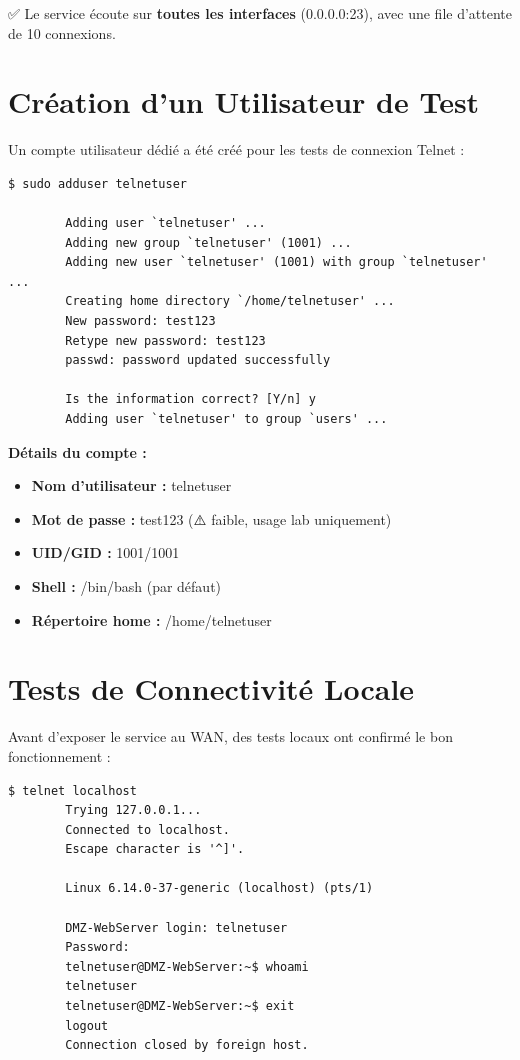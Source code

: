 \documentclass[12pt,a4paper,openany]{report}
\begin{document}
	✅ Le service écoute sur \textbf{toutes les interfaces} (0.0.0.0:23), avec une file d'attente de 10 connexions.
	
	\section{Création d'un Utilisateur de Test}
	Un compte utilisateur dédié a été créé pour les tests de connexion Telnet :
	
	\begin{lstlisting}[caption=Création de l'utilisateur telnetuser]
		$ sudo adduser telnetuser
		
		Adding user `telnetuser' ...
		Adding new group `telnetuser' (1001) ...
		Adding new user `telnetuser' (1001) with group `telnetuser' ...
		Creating home directory `/home/telnetuser' ...
		New password: test123
		Retype new password: test123
		passwd: password updated successfully
		
		Is the information correct? [Y/n] y
		Adding user `telnetuser' to group `users' ...
	\end{lstlisting}
	
	\textbf{Détails du compte :}
	\begin{itemize}
		\item \textbf{Nom d'utilisateur :} telnetuser
		\item \textbf{Mot de passe :} test123 (⚠️ faible, usage lab uniquement)
		\item \textbf{UID/GID :} 1001/1001
		\item \textbf{Shell :} /bin/bash (par défaut)
		\item \textbf{Répertoire home :} /home/telnetuser
	\end{itemize}
	
	\section{Tests de Connectivité Locale}
	Avant d'exposer le service au WAN, des tests locaux ont confirmé le bon fonctionnement :
	
	\begin{lstlisting}[caption=Test Telnet en local (localhost)]
		$ telnet localhost
		Trying 127.0.0.1...
		Connected to localhost.
		Escape character is '^]'.
		
		Linux 6.14.0-37-generic (localhost) (pts/1)
		
		DMZ-WebServer login: telnetuser
		Password: 
		telnetuser@DMZ-WebServer:~$ whoami
		telnetuser
		telnetuser@DMZ-WebServer:~$ exit
		logout
		Connection closed by foreign host.
	\end{lstlisting}
	
\end{document}
